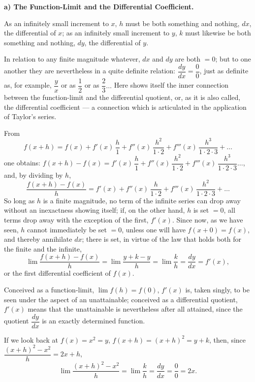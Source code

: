 \documentclass[12pt]{book}
\begin{document}
\begin{center}
\textbf{a) The Function-Limit and the Differential Coefficient.}
\end{center}
{}

As an infinitely small increment to $x$, $h$ must be both something and nothing,
$dx$, the differential of $x$; as an infinitely small increment to $y$, $k$ must
likewise be both something and nothing, $dy$, the differential of $y$.

In relation to any finite magnitude whatever, $dx$ and $dy$ are both $= 0$; but to
one another they are nevertheless in a quite definite relation:
$\dfrac{dy}{dx} = \dfrac{0}{0}$, just as definite as, for example, $\dfrac{y}{x}$ or
as $\dfrac{1}{2}$ or as $\dfrac{2}{3} \dots$ Here shows itself the inner connection
between the function-limit and the differential quotient, or, as it is also called,
the differential coefficient --- a connection which is articulated in the application
of Taylor's series.

From
\[
f(x + h) = f(x) + f'(x)\,\frac{h}{1} + f''(x)\,\frac{h^{2}}{1\cdot2}
+ f'''(x)\,\frac{h^{3}}{1\cdot2\cdot3} + \dots
\]
one obtains: $f(x + h) - f(x) = f'(x)\,\dfrac{h}{1} + f''(x)\,\dfrac{h^{2}}{1\cdot2}
+ f'''(x)\,\dfrac{h^{3}}{1\cdot2\cdot3} \dots$, and, by dividing by $h$,
\[
\frac{f(x + h) - f(x)}{h} = f'(x) + f''(x)\,\frac{h}{1\cdot2}
+ f'''(x)\,\frac{h^{2}}{1\cdot2\cdot3} + \dots
\]
So long as $h$ is a finite magnitude, no term of the infinite series can drop away
without an inexactness showing itself; if, on the other hand, $h$ is set $= 0$, all
terms drop away with the exception of the first, $f'(x)$. Since now, as we have seen,
$h$ cannot immediately be set $= 0$, unless one will have $f(x + 0) = f(x)$, and
thereby annihilate $dx$; there is set, in virtue of the law that holds both for the
finite and the infinite,
\[
\lim\frac{f(x + h) - f(x)}{h} = \lim\frac{y + k - y}{h} = \lim\frac{k}{h}
= \frac{dy}{dx} = f'(x),
\]
or the first differential coefficient of $f(x)$.

Conceived as a function-limit, $\lim f(h) = f(0)$, $f'(x)$ is, taken singly, to be
seen under the aspect of an unattainable; conceived as a differential quotient,
$f'(x)$ means that the unattainable is nevertheless after all attained, since the
quotient $\dfrac{dy}{dx}$ is an exactly determined function.

If we look back at $f(x) = x^{2} = y$, $f(x + h) = (x + h)^{2} = y + k$, then, since
$\dfrac{(x + h)^{2} - x^{2}}{h} = 2x + h$,
\[
\lim\frac{(x + h)^{2} - x^{2}}{h} = \lim\frac{k}{h} = \frac{dy}{dx}
= \frac{0}{0} = 2x.
\]
\end{document}
